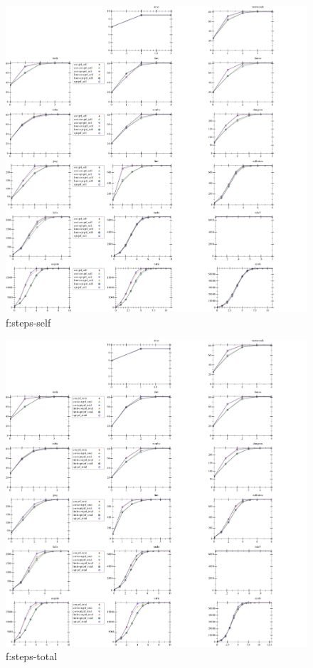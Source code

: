 \documentclass[acmsmall,review,anonymous]{acmart}
\begin{document}
\begin{figure}[t]
  \includegraphics[width=\textwidth]{data/cdf-steps_prf_self.pdf}
  \caption{f:steps-self}
  \label{f:steps-self}
\end{figure}

\begin{figure}[t]
  \includegraphics[width=\textwidth]{data/cdf-steps_prf_total.pdf}
  \caption{f:steps-total}
  \label{f:steps-total}
\end{figure}
\end{document}
